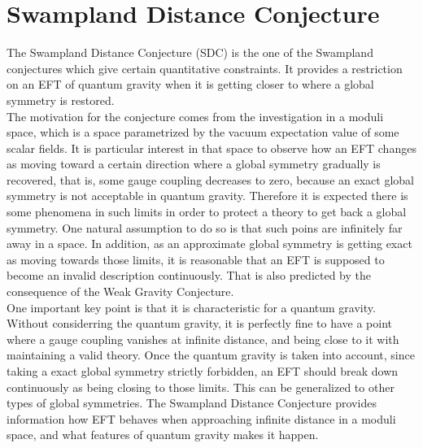 \section{Swampland Distance Conjecture}
The Swampland Distance Conjecture (SDC) is the one of the Swampland conjectures which give certain quantitative constraints. It provides a restriction on an EFT of quantum gravity when it is getting closer to where a global symmetry is restored. \\
\indent The motivation for the conjecture comes from the investigation in a moduli space, which is a space parametrized by the vacuum expectation value of some scalar fields. It is particular interest in that space to observe how an EFT changes as moving toward a certain direction where a global symmetry gradually is recovered, that is, some gauge coupling decreases to zero, because an exact global symmetry is not acceptable in quantum gravity. Therefore it is expected there is some phenomena in such limits in order to protect a theory to get back a global symmetry. One natural assumption to do so is that such poins are infinitely far away in a space. In addition, as an approximate global symmetry is getting exact as moving towards those limits, it is reasonable that an EFT is supposed to become an invalid description continuously. That is also predicted by the consequence of the Weak Gravity Conjecture. \\
\indent One important key point is that it is characteristic for a quantum gravity. Without considerring the quantum gravity, it is perfectly fine to have a point where a gauge coupling vanishes at infinite distance, and being close to it with maintaining a valid theory. Once the quantum gravity is taken into account, since taking a exact global symmetry strictly forbidden, an EFT should break down continuously as being closing to those limits. This can be generalized to other types of global symmetries. The Swampland Distance Conjecture provides information how EFT behaves when approaching infinite distance in a moduli space, and what features of quantum gravity makes it happen. 
